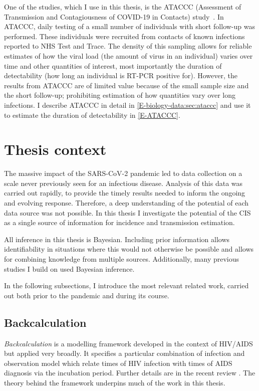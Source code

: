 \documentclass[thesis.tex]{subfiles}
\begin{document}
One of the studies, which I use in this thesis, is the ATACCC (Assessment of Transmission and Contagiousness of COVID-19 in Contacts) study~\autocite{singanayagamCommunity,hakkiOnset}.
In ATACCC, daily testing of a small number of individuals with short follow-up was performed.
These individuals were recruited from contacts of known infections reported to NHS Test and Trace.
The density of this sampling allows for reliable estimates of how the viral load (the amount of virus in an individual) varies over time and other quantities of interest, most importantly the duration of detectability (how long an individual is RT-PCR positive for).
However, the results from ATACCC are of limited value because of the small sample size and the short follow-up; prohibiting estimation of how quantities vary over long infections.
I describe ATACCC in detail in \cref{E-biology-data:sec:ataccc} and use it to estimate the duration of detectability in \cref{E-ATACCC}.

\section{Thesis context}

The massive impact of the SARS-CoV-2 pandemic led to data collection on a scale never previously seen for an infectious disease.
Analysis of this data was carried out rapidly, to provide the timely results needed to inform the ongoing and evolving response.
Therefore, a deep understanding of the potential of each data source was not possible.
In this thesis I investigate the potential of the CIS as a single source of information for incidence and transmission estimation.

All inference in this thesis is Bayesian.
Including prior information allows identifiability in situations where this would not otherwise be possible and allows for combining knowledge from multiple sources.
Additionally, many previous studies I build on used Bayesian inference.

In the following subsections, I introduce the most relevant related work, carried out both prior to the pandemic and during its course.

\subsection{Backcalculation}

\emph{Backcalculation} is a modelling framework developed in the context of HIV/AIDS~\autocite{brookmeyerMethod} but applied very broadly.
It specifies a particular combination of infection and observation model which relate times of HIV infection with times of AIDS diagnosis via the incubation period.
Further details are in the recent review \textcite{sunModeling}.
The theory behind the framework underpins much of the work in this thesis.
\end{document}
